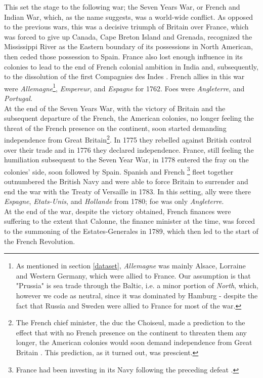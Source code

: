 \documentclass[12pt,a4paper,notitlepage,english]{article}
\begin{document}
This set the stage to the following war; the Seven Years War, or French and Indian War, which, as the name suggests, was a world-wide conflict.
As opposed to the previous wars, this was a decisive triumph of Britain over France, which was forced to give up Canada, Cape Breton Island and Grenada, recognized the Mississippi River as the Eastern boundary of its possessions in North American, then ceded those possession to Spain.
France also lost enough influence in its colonies to lead to the end of French colonial ambition in India and, subsequently, to the dissolution of the first Compagnies des Indes \citep{Riley1986}.
French allies in this war were \textit{Allemagne}\footnote{As mentioned in section \ref{dataset}, \textit{Allemagne} was mainly Alsace, Lorraine and Western Germany, which were allied to France.
Our assumption is that "Prussia" is sea trade through the Baltic, i.e. a minor portion of \textit{North}, which, however we code as neutral, since it was dominated by Hamburg - despite the fact that Russia and Sweden were allied to France for most of the war.}, \textit{Empereur}, and \textit{Espagne} for 1762.
Foes were \textit{Angleterre}, and \textit{Portugal}. \\
At the end of the Seven Years War, with the victory of Britain and the subsequent departure of the French, the American colonies, no longer feeling the threat of the French presence on the continent, soon started demanding independence from Great Britain\footnote{The French chief minister, the duc the Choiseul, made a prediction to the effect that with no French presence on the continent to threaten them any longer, the American colonies would soon demand independence from Great Britain \citep{Findlay2009}.
This prediction, as it turned out, was prescient.}.
In 1775 they rebelled against British control over their trade and in 1776 they declared independence.
France, still feeling the humiliation subsequent to the Seven Year War, in 1778 entered the fray on the colonies' side, soon followed by Spain.
Spanish and French \footnote{France had been investing in its Navy following the preceding defeat \citep{Findlay2009}.} fleet together outnumbered the British Navy and were able to force Britain to surrender and end the war with the Treaty of Versaille in 1783.
In this setting, ally were there \textit{Espagne}, \textit{Etats-Unis}, and \textit{Hollande} from 1780; foe was only \textit{Angleterre}. \\
At the end of the war, despite the victory obtained, French finances were suffering to the extent that Calonne, the finance minister at the time, was forced to the summoning of the Estates-Generales in 1789, which then led to the start of the French Revolution.
\end{document}
